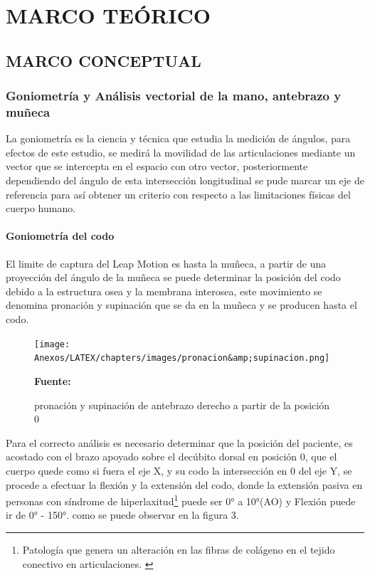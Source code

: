 \chapter{MARCO TEÓRICO}

\section{MARCO CONCEPTUAL}
\subsection{Goniometría y Análisis vectorial de la mano, antebrazo y muñeca}
La goniometría es la ciencia y técnica que estudia la medición de ángulos, para efectos de este estudio, se medirá la movilidad de las articulaciones mediante un vector que se intercepta en el espacio con otro vector, posteriormente dependiendo del ángulo de esta intersección longitudinal se pude marcar un eje de referencia para así obtener un criterio con respecto a las limitaciones físicas del cuerpo humano.  \parencite{Taboadela2007TaboadelaLaborales.}

\subsubsection{Goniometría del codo}
El limite de captura del Leap Motion es hasta la muñeca, a partir de una proyección del ángulo de la muñeca se puede determinar la posición del codo debido a la estructura osea y la membrana interosea, este movimiento se denomina pronación y supinación que se da en la muñeca y se producen hasta el codo. \parencite{Taboadela2007TaboadelaLaborales.} 

\begin{figure}[H]
    \centering
    \texttt{[image: Anexos/LATEX/chapters/images/pronacion\&amp;supinacion.png]}
    \caption{pronación y supinación de antebrazo derecho a partir de la posición 0}
    \small{\textbf{Fuente:} \parencite{Taboadela2007TaboadelaLaborales.} }
    \label{GONIOMETRIA_CODO_0}
\end{figure}


Para el correcto análisis es necesario determinar que la posición del paciente, es acostado con el brazo apoyado sobre el decúbito dorsal en posición 0, que el cuerpo quede como si fuera el eje X, y su codo la intersección en 0 del eje Y, se procede a efectuar la flexión y la extensión del codo, donde la extensión pasiva en personas con síndrome de hiperlaxitud\footnote{Patología que genera un alteración en las fibras de colágeno en el tejido conectivo en articulaciones. \parencite[1]{PedroRevistaClinic}} puede ser 0° a 10°(AO) y  Flexión puede ir de 0° - 150°. como se puede observar en la figura 3.

